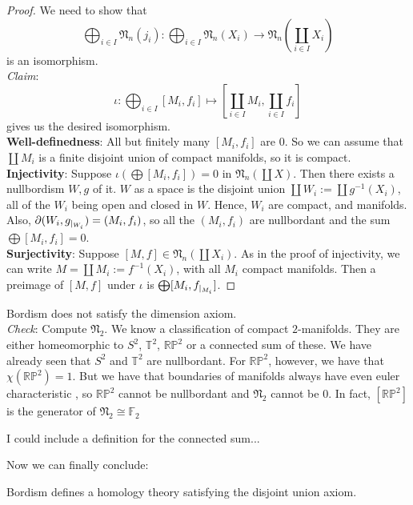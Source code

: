 \documentclass[a4paper,11pt]{article}
\begin{document}
\begin{proof}\cite{zhang}
    We need to show that 
    \[\bigoplus_{i\in I}\mathfrak{N}_n(j_i):\bigoplus_{i\in I}\mathfrak{N}_n(X_i)\to\mathfrak{N}_n\left(\coprod_{i\in I}X_i\right)\] 
    is an isomorphism.\\
    \textit{Claim}: \[\iota:\bigoplus_{i\in I}[M_i,f_i]\mapsto \left[\coprod_{i\in I}M_i,\coprod_{i\in I} f_i\right]\]
    gives us the desired isomorphism.\\
    \textbf{Well-definedness}: All but finitely many \([M_i,f_i]\) are \(0\). So we can assume that \(\coprod M_i\) is a finite disjoint union of compact manifolds, so it is compact.
    \textbf{Injectivity}: Suppose \(\iota\left(\bigoplus[M_i,f_i]\right)=0\) in \(\mathfrak{N}_n(\coprod X)\). Then there exists a nullbordism \(W,g\) of it. \(W\) as a space is the disjoint union \(\coprod W_i:=\coprod g^{-1}(X_i)\), all of the \(W_i\) being open and closed in \(W\). Hence, \(W_i\) are compact, and manifolds. Also, \(\partial(W_i,g_{|_{W_i}})=(M_i,f_i)\), so all the \((M_i,f_i)\) are nullbordant and the sum \(\bigoplus[M_i,f_i]=0\).
    \\
    \textbf{Surjectivity}: Suppose \([M,f]\in\mathfrak{N}_n(\coprod X_i)\). As in the proof of injectivity, we can write \(M=\coprod M_i:=f^{-1}(X_i)\), with all \(M_i\) compact manifolds. Then a preimage of \([M,f]\) under \(\iota\) is \(\bigoplus[M_i,f_{|_{M_i}}]\).
\end{proof}

\begin{observation}
    Bordism does not satisfy the dimension axiom.\\
    \textit{Check}: Compute \(\mathfrak{N}_2\). We know a classification of compact \(2\)-manifolds. They are either homeomorphic to \(S^2\), \(\mathbb{T}^2\), \(\mathbb{RP}^2\) or a connected sum of these. We have already seen that \(S^2\) and \(\mathbb{T}^2\) are nullbordant. For \(\mathbb{RP}^2\), however, we have that \(\chi(\mathbb{RP}^2)=1\). But we have that boundaries of manifolds always have even euler characteristic {\cite[Proposition 18.6.2]{dieck}}, so \(\mathbb{RP}^2\) cannot be nullbordant and \(\mathfrak{N}_2\) cannot be \(0\). In fact, \([\mathbb{RP}^2]\) is the generator of \(\mathfrak{N}_2\cong\mathbb{F}_2\)
\end{observation}

I could include a definition for the connected sum...

Now we can finally conclude:

\begin{theorem}
    Bordism defines a homology theory satisfying the disjoint union axiom.
\end{theorem}
\end{document}
